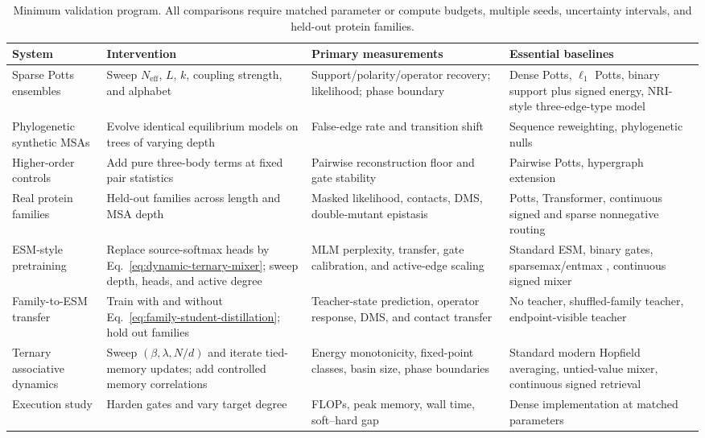 \documentclass[10pt,twocolumn]{article}
\newcommand{\1}{\mathbf 1}
\theoremstyle{remark}
\begin{document}
\begin{table}[t]
\centering
\small
\begin{tabular}{p{}p{}p{}p{}}
\toprule
System & Intervention & Primary measurements & Essential baselines \\
\midrule
Sparse Potts ensembles & Sweep $N_{\mathrm{eff}}$, $L$, $k$, coupling strength, and alphabet &
Support/polarity/operator recovery; likelihood; phase boundary & Dense Potts, $\ell_1$ Potts,
binary support plus signed energy, NRI-style three-edge-type model \\
Phylogenetic synthetic MSAs & Evolve identical equilibrium models on trees of varying depth &
False-edge rate and transition shift & Sequence reweighting, phylogenetic nulls \\
Higher-order controls & Add pure three-body terms at fixed pair statistics & Pairwise reconstruction
floor and gate stability & Pairwise Potts, hypergraph extension \\
Real protein families & Held-out families across length and MSA depth & Masked likelihood, contacts,
DMS, double-mutant epistasis & Potts, Transformer, continuous signed and sparse nonnegative routing \\
ESM-style pretraining & Replace source-softmax heads by Eq.~\ref{eq:dynamic-ternary-mixer}; sweep
depth, heads, and active degree & MLM perplexity, transfer, gate calibration, and active-edge scaling
& Standard ESM, binary gates, sparsemax/entmax \cite{martins2016,peters2019}, continuous signed mixer \\
Family-to-ESM transfer & Train with and without Eq.~\ref{eq:family-student-distillation}; hold out
families & Teacher-state prediction, operator response, DMS, and contact transfer & No teacher,
shuffled-family teacher, endpoint-visible teacher \\
Ternary associative dynamics & Sweep $(\beta,\lambda,N/d)$ and iterate tied-memory updates; add
controlled memory correlations & Energy monotonicity, fixed-point classes, basin size, phase
boundaries & Standard modern Hopfield averaging, untied-value mixer, continuous signed retrieval \\
Execution study & Harden gates and vary target degree & FLOPs, peak memory, wall time, soft--hard gap
& Dense implementation at matched parameters \\
\bottomrule
\end{tabular}
\caption{Minimum validation program.  All comparisons require matched parameter or compute budgets,
multiple seeds, uncertainty intervals, and held-out protein families.}
\label{tab:experiments}
\end{table}
\end{document}
